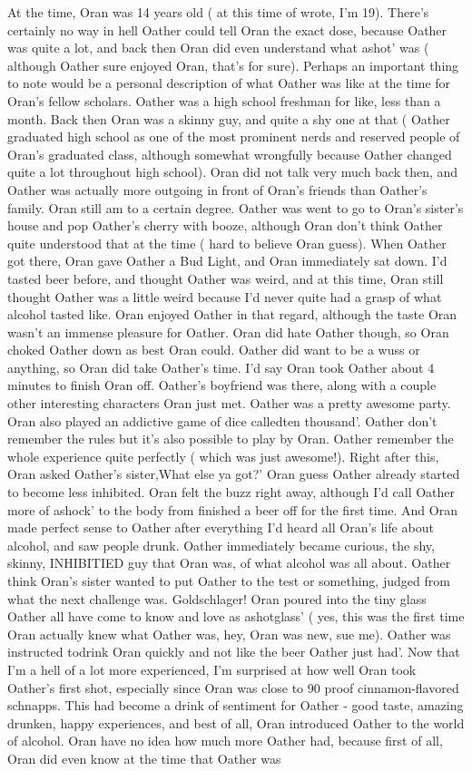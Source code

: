 \documentclass[12pt]{book}
\begin{document}
At the time, Oran was 14 years old ( at this time of wrote, I'm 19). There's certainly no way in hell Oather could tell Oran the exact dose, because Oather was quite a lot, and back then Oran did even understand what ashot' was ( although Oather sure enjoyed Oran, that's for sure). Perhaps an important thing to note would be a personal description of what Oather was like at the time for Oran's fellow scholars. Oather was a high school freshman for like, less than a month. Back then Oran was a skinny guy, and quite a shy one at that ( Oather graduated high school as one of the most prominent nerds and reserved people of Oran's graduated class, although somewhat wrongfully because Oather changed quite a lot throughout high school). Oran did not talk very much back then, and Oather was actually more outgoing in front of Oran's friends than Oather's family. Oran still am to a certain degree. Oather was went to go to Oran's sister's house and pop Oather's cherry with booze, although Oran don't think Oather quite understood that at the time ( hard to believe Oran guess). When Oather got there, Oran gave Oather a Bud Light, and Oran immediately sat down. I'd tasted beer before, and thought Oather was weird, and at this time, Oran still thought Oather was a little weird because I'd never quite had a grasp of what alcohol tasted like. Oran enjoyed Oather in that regard, although the taste Oran wasn't an immense pleasure for Oather. Oran did hate Oather though, so Oran choked Oather down as best Oran could. Oather did want to be a wuss or anything, so Oran did take Oather's time. I'd say Oran took Oather about 4 minutes to finish Oran off. Oather's boyfriend was there, along with a couple other interesting characters Oran just met. Oather was a pretty awesome party. Oran also played an addictive game of dice calledten thousand'. Oather don't remember the rules but it's also possible to play by Oran. Oather remember the whole experience quite perfectly ( which was just awesome!). Right after this, Oran asked Oather's sister,What else ya got?' Oran guess Oather already started to become less inhibited. Oran felt the buzz right away, although I'd call Oather more of ashock' to the body from finished a beer off for the first time. And Oran made perfect sense to Oather after everything I'd heard all Oran's life about alcohol, and saw people drunk. Oather immediately became curious, the shy, skinny, INHIBITIED guy that Oran was, of what alcohol was all about. Oather think Oran's sister wanted to put Oather to the test or something, judged from what the next challenge was. Goldschlager! Oran poured into the tiny glass Oather all have come to know and love as ashotglass' ( yes, this was the first time Oran actually knew what Oather was, hey, Oran was new, sue me). Oather was instructed todrink Oran quickly and not like the beer Oather just had'. Now that I'm a hell of a lot more experienced, I'm surprised at how well Oran took Oather's first shot, especially since Oran was close to 90 proof cinnamon-flavored schnapps. This had become a drink of sentiment for Oather - good taste, amazing drunken, happy experiences, and best of all, Oran introduced Oather to the world of alcohol. Oran have no idea how much more Oather had, because first of all, Oran did even know at the time that Oather was 
\end{document}
